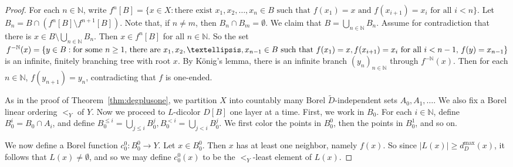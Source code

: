 \documentclass[10pt,a4paper]{amsart}
\newcommand{\N}{\mathbb N}
\begin{document}
\begin{proof}
    For each $n \in \N$, write $f^n[B] = \{x \in X : \text{there exist } x_1, x_2, \dots, x_n \in B \text{ such that } f(x_1) = x \text{ and } f(x_{i + 1}) = x_i \text{ for all $i < n$} \}$. Let $B_n = B \cap (f^n[B] \setminus f^{n + 1}[B])$. Note that, if $n \neq m$, then $B_n \cap B_m = \emptyset$. We claim that $B = \bigcup_{n \in \N} B_n$. Assume for contradiction that there is $x \in B \setminus \bigcup_{n \in \N} B_n$. Then $x \in f^n[B]$ for all $n \in \N$. So the set $f^{-\N}(x) = \{y \in B : \text{for some $n \geq 1$, there are } \\ x_1, x_2, \dots, x_{n - 1} \in B \text{ such that } f(x_1) = x, f(x_{i + 1}) = x_i \text{ for all $i < n - 1$, } f(y) = x_{n -1} \}$ is an infinite, finitely branching tree with root $x$. By K{\" o}nig's lemma, there is an infinite branch $(y_n)_{n \in \N}$ through $f^{-\N}(x)$. Then for each $n \in \N$, $f(y_{n + 1}) = y_n$, contradicting that $f$ is one-ended.

    As in the proof of Theorem~\ref{thm:degplusone}, we partition $X$ into countably many Borel $\tilde{D}$-independent sets $A_0, A_1, \dots$. We also fix a Borel linear ordering $<_Y$ of $Y$. Now we proceed to $L$-dicolor $D[B]$ one layer at a time. First, we work in $B_0$. For each $i \in \N$, define $B_0^i = B_0 \cap A_i$, and define $B_0^{\leq i} = \bigcup_{j \leq i} B_0^j, B_0^{< i} = \bigcup_{j < i} B_0^j$. We first color the points in $B_0^0$, then the points in $B_0^1$, and so on.

    We now define a Borel function $c_0^0 : B_0^0 \to Y$. Let $x \in B_0^0$. Then $x$ has at least one neighbor, namely $f(x)$. So since $\vert L(x) \vert \geq d^{\max}_D(x)$, it follows that $L(x) \neq \emptyset$, and so we may define $c_0^0(x)$ to be the $<_Y$-least element of $L(x)$.


\end{proof}
\end{document}
